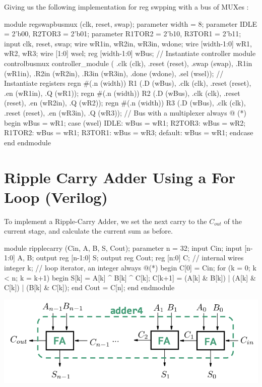 \documentclass[12pt,openany]{book}
\begin{document}
Giving us the following implementation for reg swpping with a bus of MUXes :
\begin{vhdl}
module regswapbusmux (clk, reset, swap);
		parameter width = 8;
		parameter IDLE = 2'b00, R2TOR3 = 2'b01;
		parameter R1TOR2 = 2'b10, R3TOR1 = 2'b11;
		input clk, reset, swap;
		wire wR1in, wR2in, wR3in, wdone;
		wire [width-1:0] wR1, wR2, wR3;
		wire [1:0] wsel;
		reg [width-1:0] wBus;
		// Instantiate controller module
		controlbusmux controller_module ( .clk (clk), .reset (reset), .swap (swap),
		.R1in (wR1in), .R2in (wR2in), .R3in (wR3in),
		.done (wdone), .sel (wsel));
		// Instantiate registers
		regn #(.n (width)) R1 (.D (wBus), .clk (clk), .reset (reset), .en (wR1in), .Q (wR1));
		regn #(.n (width)) R2 (.D (wBus), .clk (clk), .reset (reset), .en (wR2in), .Q (wR2));
		regn #(.n (width)) R3 (.D (wBus), .clk (clk), .reset (reset), .en (wR3in), .Q (wR3));
		// Bus with a multiplexer
		always @ (*) begin
			wBus = wR1;
			case (wsel)
				IDLE: wBus = wR1;
				R2TOR3: wBus = wR2;
				R1TOR2: wBus = wR1;
				R3TOR1: wBus = wR3;
				default: wBus = wR1;
			endcase
		end
endmodule
\end{vhdl}


\section{Ripple Carry Adder Using a For Loop (Verilog)}
To implement a Ripple-Carry Adder, we set the next carry to the $C_{out}$ of the current stage, and calculate the current sum as before.
\newline
\vspace*{10px}
\begin{minipage}[htp]{0.45\textwidth}	
	\begin{vhdl}
module ripplecarry (Cin, A, B, S, Cout);
	parameter n = 32;
	input Cin;
	input [n-1:0] A, B;
	output reg [n-1:0] S;
	output reg Cout;
	reg [n:0] C; // internal wires
	integer k; // loop iterator, an integer
	always @(*) begin
		C[0] = Cin;
		for (k = 0; k < n; k = k+1) begin
		S[k] = A[k] ^ B[k] ^ C[k];
		C[k+1] = (A[k] & B[k]) | (A[k] & C[k]) | (B[k] & C[k]);
	end
	Cout = C[n];
	end
endmodule
	\end{vhdl}
\end{minipage}
\hfill
\vline
\hfill
\begin{minipage}[htp]{0.45\textwidth}
	\begin{center}
		\includegraphics[width=1.3\textwidth]{circuits/10.2.4_2.png}
	\end{center}	
\end{minipage}
\end{document}
